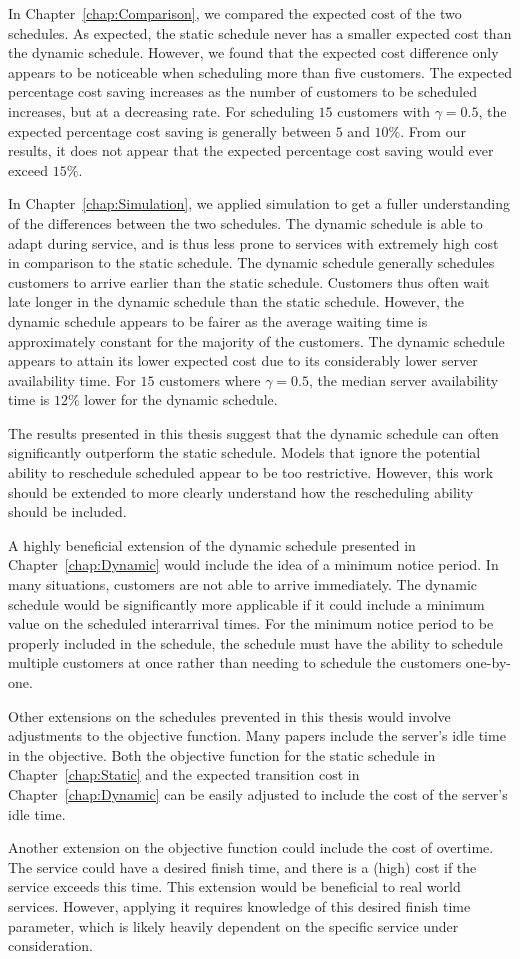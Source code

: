 In Chapter~\ref{chap:Comparison}, we compared the expected cost of the two schedules. As expected, the static schedule never has a smaller expected cost than the dynamic schedule. However, we found that the expected cost difference only appears to be noticeable when scheduling more than five customers. The expected percentage cost saving increases as the number of customers to be scheduled increases, but at a decreasing rate. For scheduling $15$ customers with $\gamma = 0.5$, the expected percentage cost saving is generally between $5$ and $10\%$. From our results, it does not appear that the expected percentage cost saving would ever exceed $15\%$.

In Chapter~\ref{chap:Simulation}, we applied simulation to get a fuller understanding of the differences between the two schedules. The dynamic schedule is able to adapt during service, and is thus less prone to services with extremely high cost in comparison to the static schedule. The dynamic schedule generally schedules customers to arrive earlier than the static schedule. Customers thus often wait late longer in the dynamic schedule than the static schedule. However, the dynamic schedule appears to be fairer as the average waiting time is approximately constant for the majority of the customers. The dynamic schedule appears to attain its lower expected cost due to its considerably lower server availability time. For $15$ customers where $\gamma = 0.5$, the median server availability time is $12 \%$ lower for the dynamic schedule.

The results presented in this thesis suggest that the dynamic schedule can often significantly outperform the static schedule. Models that ignore the potential ability to reschedule scheduled appear to be too restrictive. However, this work should be extended to more clearly understand how the rescheduling ability should be included.

A highly beneficial extension of the dynamic schedule presented in Chapter~\ref{chap:Dynamic} would include the idea of a minimum notice period. In many situations, customers are not able to arrive immediately. The dynamic schedule would be significantly more applicable if it could include a minimum value on the scheduled interarrival times. For the minimum notice period to be properly included in the schedule, the schedule must have the ability to schedule multiple customers at once rather than needing to schedule the customers one-by-one.

Other extensions on the schedules prevented in this thesis would involve adjustments to the objective function. Many papers include the server's idle time in the objective. Both the objective function for the static schedule in Chapter~\ref{chap:Static} and the expected transition cost in Chapter~\ref{chap:Dynamic} can be easily adjusted to include the cost of the server's idle time.

Another extension on the objective function could include the cost of overtime. The service could have a desired finish time, and there is a (high) cost if the service exceeds this time. This extension would be beneficial to real world services. However, applying it requires knowledge of this desired finish time parameter, which is likely heavily dependent on the specific service under consideration.